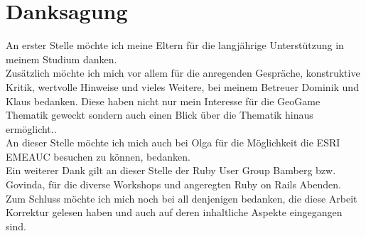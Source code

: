 \chapter*{Danksagung}
\label{ch0:Dank}

An erster Stelle möchte ich meine Eltern für die langjährige Unterstützung in meinem Studium danken.\\
Zusätzlich möchte ich mich vor allem für die anregenden Gespräche, konstruktive Kritik, wertvolle Hinweise und vieles Weitere, bei meinem Betreuer Dominik und Klaus bedanken.
Diese haben nicht nur mein Interesse für die GeoGame Thematik geweckt sondern auch einen Blick über die Thematik hinaus ermöglicht..\\
An dieser Stelle möchte ich mich auch bei Olga für die Möglichkeit die ESRI EMEAUC besuchen zu können, bedanken.\\
Ein weiterer Dank gilt an dieser Stelle der Ruby User Group Bamberg bzw. Govinda, für die diverse Workshops und angeregten Ruby on Rails Abenden.
Zum Schluss möchte ich mich noch bei all denjenigen bedanken, die diese Arbeit Korrektur gelesen haben und auch auf deren inhaltliche Aspekte eingegangen sind.\\

